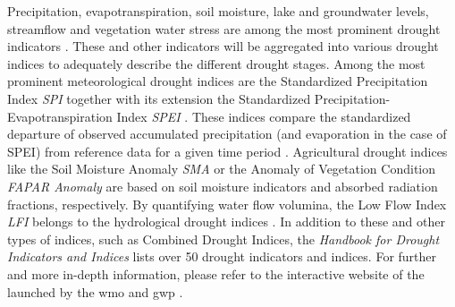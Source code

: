 Precipitation, evapotranspiration, soil moisture, lake and groundwater levels, streamflow and vegetation water stress are among the most prominent drought indicators \autocite{europeandroughtobservatoryDroughtIndicators2017}. These and other indicators will be aggregated into various drought indices to adequately describe the different drought stages. Among the most prominent meteorological drought indices are the Standardized Precipitation Index \textit{SPI} together with its extension the Standardized Precipitation-Evapotranspiration Index \textit{SPEI} \autocite{europeandroughtobservatoryDroughtIndicators2017,ncarStandardizedPrecipitationEvapotranspiration,ncarStandardizedPrecipitationIndex}. These indices compare the standardized departure of observed accumulated precipitation (and evaporation in the case of SPEI) from reference data for a given time period \autocite{ncarStandardizedPrecipitationIndex,ncarStandardizedPrecipitationEvapotranspiration}. Agricultural drought indices like the Soil Moisture Anomaly \textit{SMA} or the Anomaly of Vegetation Condition \textit{FAPAR Anomaly} are based on soil moisture indicators and absorbed radiation fractions, respectively. By quantifying water flow volumina, the Low Flow Index \textit{LFI} belongs to the hydrological drought indices \autocite{europeandroughtobservatoryDroughtIndicators2017, svobodaHandbookDroughtIndicators2016}. In addition to these and other types of indices, such as Combined Drought Indices, the \textit{Handbook for Drought Indicators and Indices} lists over 50 drought indicators and indices. For further and more in-depth information, please refer to the interactive website of the  launched by the \acrfull{wmo} and \acrfull{gwp} \autocite{idmpIndicatorsIndicesIntegrated2021}.


